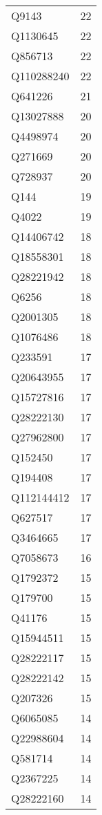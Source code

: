 \begin{tabular}{lr}
       Q9143 &     22 \\
    Q1130645 &     22 \\
     Q856713 &     22 \\
  Q110288240 &     22 \\
     Q641226 &     21 \\
   Q13027888 &     20 \\
    Q4498974 &     20 \\
     Q271669 &     20 \\
     Q728937 &     20 \\
        Q144 &     19 \\
       Q4022 &     19 \\
   Q14406742 &     18 \\
   Q18558301 &     18 \\
   Q28221942 &     18 \\
       Q6256 &     18 \\
    Q2001305 &     18 \\
    Q1076486 &     18 \\
     Q233591 &     17 \\
   Q20643955 &     17 \\
   Q15727816 &     17 \\
   Q28222130 &     17 \\
   Q27962800 &     17 \\
     Q152450 &     17 \\
     Q194408 &     17 \\
  Q112144412 &     17 \\
     Q627517 &     17 \\
    Q3464665 &     17 \\
    Q7058673 &     16 \\
    Q1792372 &     15 \\
     Q179700 &     15 \\
      Q41176 &     15 \\
   Q15944511 &     15 \\
   Q28222117 &     15 \\
   Q28222142 &     15 \\
     Q207326 &     15 \\
    Q6065085 &     14 \\
   Q22988604 &     14 \\
     Q581714 &     14 \\
    Q2367225 &     14 \\
   Q28222160 &     14 \\

\end{tabular}
